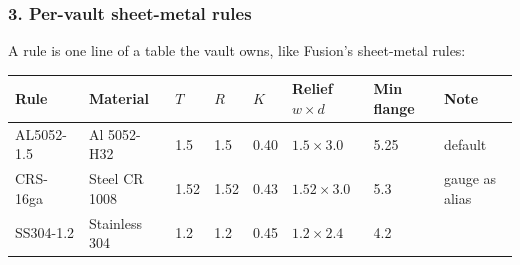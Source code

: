 \subsubsection*{3. Per-vault sheet-metal rules}

A rule is one line of a table the vault owns, like Fusion's sheet-metal rules:
\begin{center}
\small
\begin{tabularx}{\linewidth}{@{}lllllllX@{}}
\toprule
Rule & Material & $T$ & $R$ & $K$ & Relief $w\times d$ & Min flange & Note\\
\midrule
AL5052-1.5 & Al 5052-H32 & 1.5 & 1.5 & 0.40 & $1.5\times3.0$ & 5.25 & default\\
CRS-16ga & Steel CR 1008 & 1.52 & 1.52 & 0.43 & $1.52\times3.0$ & 5.3 & gauge as alias\\
SS304-1.2 & Stainless 304 & 1.2 & 1.2 & 0.45 & $1.2\times2.4$ & 4.2 & \\
\bottomrule
\end{tabularx}
\end{center}

